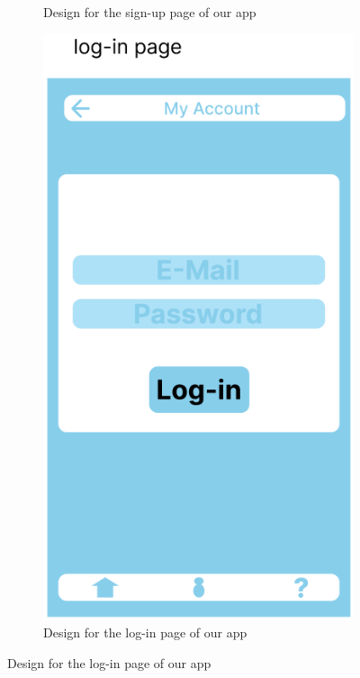 \begin{figure}
\begin{subfigure}[T]{0.4\linewidth}
		\caption{Design for the sign-up page of our app}
		\label{fig:sign_in}
	\end{subfigure}
	\hfill
	\begin{subfigure}[T]{0.4\linewidth}
		\includegraphics[width=\linewidth]{figures/log_in.png}
		\caption{Design for the log-in page of our app}
		\label{fig:log_in}
	\end{subfigure}
\end{figure}
